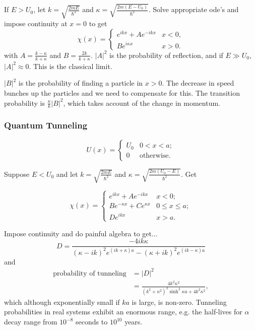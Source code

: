 \documentclass[a4paper]{article}
\newcommand{\abs}[1]{\left| #1 \right|}
\begin{document}
If $E>U_0$, let $k=\sqrt{\frac{2 m E}{\hbar^2}}$ and 
$\kappa = \sqrt{\frac{2 m (E-U_0)}{\hbar^2}}$.  Solve appropriate ode's
and impose continuity at $x=0$ to get
\[
\chi(x) =
\begin{cases}
e^{i k x} + A e^{-i k x}        & x < 0, \\
B e^{i \kappa x}        & x > 0.
\end{cases}
\]
with $A = \frac{k-\kappa}{k+\kappa}$ and $B = \frac{2 k}{k + \kappa}$.
$\abs{A}^2$ is the probability of reflection, and if $E \gg U_0$,
$\abs{A}^2 \approx 0$.  This is the classical limit.

$\abs{B}^2$ is the probability of finding a particle in $x>0$.  The decrease
in speed bunches up the particles and we need to compensate for this.  The
transition probability is $\frac{\kappa}{k}\abs{B}^2$, which takes account
of the change in momentum.

\subsubsection{Quantum Tunneling}

\[
U(x) = 
\begin{cases}
U_0     & 0<x<a; \\
0       & \text{otherwise.}
\end{cases}
\]

Suppose $E<U_0$ and let $k=\sqrt{\frac{2 m E}{\hbar^2}}$ and 
$\kappa = \sqrt{\frac{2 m (U_0-E)}{\hbar^2}}$.  Get

\[
\chi(x) =
\begin{cases}
e^{i k x} + A e^{-i k x}        & x < 0; \\
B e^{- \kappa x} + C e^{\kappa x}       & 0 \le x \le a; \\
D e^{i k x}     & x > a.
\end{cases}
\]

Impose continuity and do painful algebra to get...
\[
D = \frac{-4 i k \kappa}{(\kappa - i k)^2 e^{(i k + \kappa)a}-(\kappa + i k)^2
e^{(i k - \kappa) a}}
\]
and
\begin{align*}
\text{probability of tunneling} &= \abs{D}^2 \\
& = \frac{4 k^2 \kappa^2}{(k^2+\kappa^2)^2 \sinh^2 \kappa a +4 k^2 \kappa^2},
\end{align*}
which although exponentially small if $k a$ is large, is non-zero.  Tunneling
probabilities in real systems exhibit an enormous range, e.g. the half-lives
for $\alpha$ decay range from $10^{-8}$ seconds to $10^{10}$ years.
\end{document}

